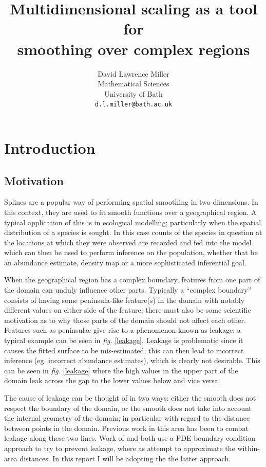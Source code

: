 \documentclass[a4paper,10pt]{article}
\title{Multidimensional scaling as a tool for \\smoothing over complex regions}
\author{David Lawrence Miller\\Mathematical Sciences\\University of Bath\\\texttt{d.l.miller@bath.ac.uk}}
\newcommand{\fig}[1]{\emph{fig.} \ref{#1}}
\begin{document}
 
 
 
\newtheorem{thm}{Theorem}[section]
 
\newtheorem{defn}{Definition}[section]
 
\maketitle

\section{Introduction}

\subsection{Motivation}

Splines are a popular way of performing spatial smoothing in two dimensions. In this context, they are used to fit smooth functions over a geographical region. A typical application of this is in ecological modelling; particularly when the spatial distribution of a species is sought. In this case counts of the species in question at the locations at which they were observed are recorded and fed into the model which can then be used to perform inference on the population, whether that be an abundance estimate, density map or a more sophisticated inferential goal.

When the geographical region has a complex boundary, features from one part of the domain can unduly influence other parts. Typically a ``complex boundary'' consists of having some peninsula-like feature(s) in the domain with notably different values on either side of the feature; there must also be some scientific motivation as to why those parts of the domain should not affect each other. Features such as peninsulae give rise to a phenomenon known as leakage; a typical example can be seen in \fig{leakage}. Leakage is problematic since it causes the fitted surface to be mis-estimated; this can then lead to incorrect inference (eg. incorrect abundance estimates), which is clearly not desirable. This can be seen in \fig{leakage} where the high values in the upper part of the domain leak across the gap to the lower values below and vice versa.

The cause of leakage can be thought of in two ways: either the smooth does not respect the boundary of the domain, or the smooth does not take into account the internal geometry of the domain; in particular with regard to the distance between points in the domain. Previous work in this area has been to combat leakage along these two lines. Work of \cite{ramsay} and \cite{soap} both use a PDE boundary condition approach to try to prevent leakage, where as \cite{wangranalli} attempt to approximate the within-area distances. In this report I will be adopting the the latter approach.
\end{document}
